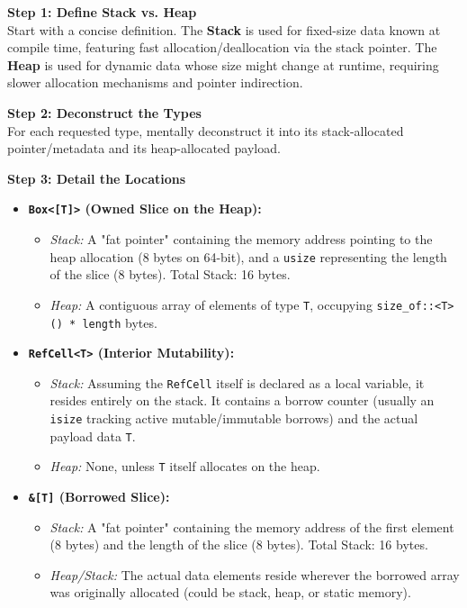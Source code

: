 \textbf{Step 1: Define Stack vs. Heap}\\
Start with a concise definition. The \textbf{Stack} is used for fixed-size data known at compile time, featuring fast allocation/deallocation via the stack pointer. The \textbf{Heap} is used for dynamic data whose size might change at runtime, requiring slower allocation mechanisms and pointer indirection.

\textbf{Step 2: Deconstruct the Types}\\
For each requested type, mentally deconstruct it into its stack-allocated pointer/metadata and its heap-allocated payload.

\textbf{Step 3: Detail the Locations}
\begin{itemize}
    \item \textbf{\texttt{Box<[T]>} (Owned Slice on the Heap):}
    \begin{itemize}
        \item \textit{Stack:} A "fat pointer" containing the memory address pointing to the heap allocation (8 bytes on 64-bit), and a \texttt{usize} representing the length of the slice (8 bytes). Total Stack: 16 bytes.
        \item \textit{Heap:} A contiguous array of elements of type \texttt{T}, occupying \texttt{size\_of::<T>() * length} bytes.
    \end{itemize}
    
    \item \textbf{\texttt{RefCell<T>} (Interior Mutability):}
    \begin{itemize}
        \item \textit{Stack:} Assuming the \texttt{RefCell} itself is declared as a local variable, it resides entirely on the stack. It contains a borrow counter (usually an \texttt{isize} tracking active mutable/immutable borrows) and the actual payload data \texttt{T}.
        \item \textit{Heap:} None, unless \texttt{T} itself allocates on the heap.
    \end{itemize}
    
    \item \textbf{\texttt{\&[T]} (Borrowed Slice):}
    \begin{itemize}
        \item \textit{Stack:} A "fat pointer" containing the memory address of the first element (8 bytes) and the length of the slice (8 bytes). Total Stack: 16 bytes.
        \item \textit{Heap/Stack:} The actual data elements reside wherever the borrowed array was originally allocated (could be stack, heap, or static memory).
    \end{itemize}
\end{itemize}

